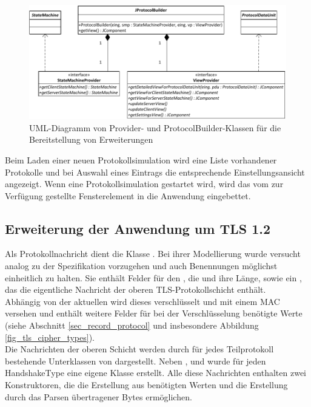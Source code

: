 \begin{figure}
	\centering
	\includegraphics[scale=0.9]{Diagrams/uml/abstract_provider_builder.pdf} %
	\caption{UML-Diagramm von Provider- und ProtocolBuilder-Klassen für die Bereitstellung von Erweiterungen}
	\label{fig_uml_abstract_provider_builder}
\end{figure}

Beim Laden einer neuen Protokollsimulation wird eine Liste vorhandener Protokolle und bei Auswahl eines Eintrags die entsprechende Einstellungsansicht angezeigt. Wenn eine Protokollsimulation gestartet wird, wird das vom  zur Verfügung gestellte Fensterelement in die Anwendung eingebettet.

\subsection{Erweiterung der Anwendung um TLS 1.2}


Als Protokollnachricht dient die Klasse . Bei ihrer Modellierung wurde versucht analog zu der Spezifikation vorzugehen und auch Benennungen möglichst einheitlich zu halten. Sie enthält Felder für den , die  und ihre Länge, sowie ein , das die eigentliche Nachricht der oberen TLS-Protokollschicht enthält. \\
Abhängig von der aktuellen \ciphersuite{} wird dieses  verschlüsselt und mit einem MAC versehen und enthält weitere Felder für bei der Verschlüsselung benötigte Werte (siehe Abschnitt \ref{sec_record_protocol} und insbesondere Abbildung \ref{fig_tls_cipher_types}). \\
Die Nachrichten der oberen Schicht werden durch für jedes Teilprotokoll bestehende Unterklassen von  dargestellt. Neben ,  und  wurde für jeden HandshakeType eine eigene Klasse erstellt. Alle diese Nachrichten enthalten zwei Konstruktoren, die die Erstellung aus benötigten Werten und die Erstellung durch das Parsen übertragener Bytes ermöglichen. 


